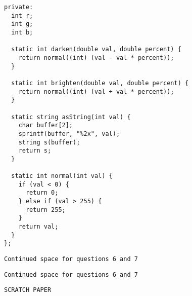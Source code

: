 \documentclass[11pt,answers]{exam}
\begin{document}
\begin{questions}
\begin{solution}
\begin{lstlisting}
private:
  int r;
  int g;
  int b;

  static int darken(double val, double percent) {
    return normal((int) (val - val * percent));
  }
    
  static int brighten(double val, double percent) {
    return normal((int) (val + val * percent));
  }
  
  static string asString(int val) {
    char buffer[2];
    sprintf(buffer, "%2x", val);
    string s(buffer);
    return s;
  }

  static int normal(int val) {
    if (val < 0) {
      return 0;
    } else if (val > 255) {
      return 255;
    }
    return val;
  }
};  
\end{lstlisting}
\end{solution}

\newpage
\begin{center}{\tt Continued space for questions 6 and 7} \end{center}

\newpage
\begin{center}{\tt Continued space for questions 6 and 7} \end{center}

\newpage
\begin{center}{\tt SCRATCH PAPER} \end{center}


\end{questions}
\end{document}
